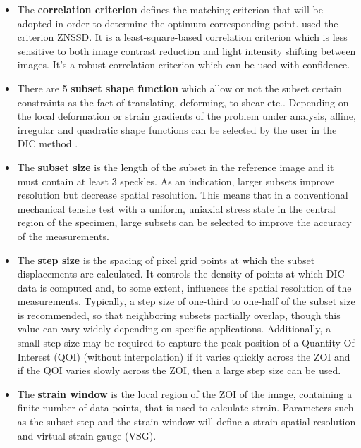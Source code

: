 \begin{itemize}
	\item The \textbf{correlation criterion} defines the matching criterion that will be adopted in order to determine the optimum corresponding point. \cite{Reference10}  used the criterion ZNSSD. It is a least-square-based correlation criterion which is less sensitive to both image contrast reduction and light intensity shifting between images. It's a robust correlation criterion which can be used with confidence. 
	\item There are 5 \textbf{subset shape function} which allow or not the subset certain constraints as the fact of translating, deforming, to shear etc.. Depending on the local deformation or strain gradients of the problem under analysis, affine, irregular and quadratic shape functions can be selected by the user in the DIC method \cite{Reference21}. 
	\item The \textbf{subset size} is the length of the subset in the reference image and it must contain at least 3 speckles. As an indication, larger subsets improve resolution but decrease spatial resolution. This means that in a conventional mechanical tensile test with a uniform, uniaxial stress state in the central region of the specimen, large subsets can be selected to improve the accuracy of the measurements.
	\item The \textbf{step size} is the spacing of pixel grid points at which the subset displacements are calculated. It controls the density of points at which DIC data is computed and, to some extent, influences the spatial resolution of the measurements. Typically, a step size of one-third to one-half of the subset size is recommended, so that neighboring subsets partially overlap, though this value can vary widely depending on specific applications. Additionally, a small step size may be required to capture the peak position of a Quantity Of Interest (QOI) (without interpolation) if it varies quickly across the ZOI and if the QOI varies slowly across the ZOI, then a large step size can be used. 
	\item The \textbf{strain window} is the local region of the ZOI of the image, containing a finite number of data points, that is used to calculate strain. Parameters such as the subset step and the strain window will define a strain spatial resolution and virtual strain gauge (VSG). 

\end{itemize}
